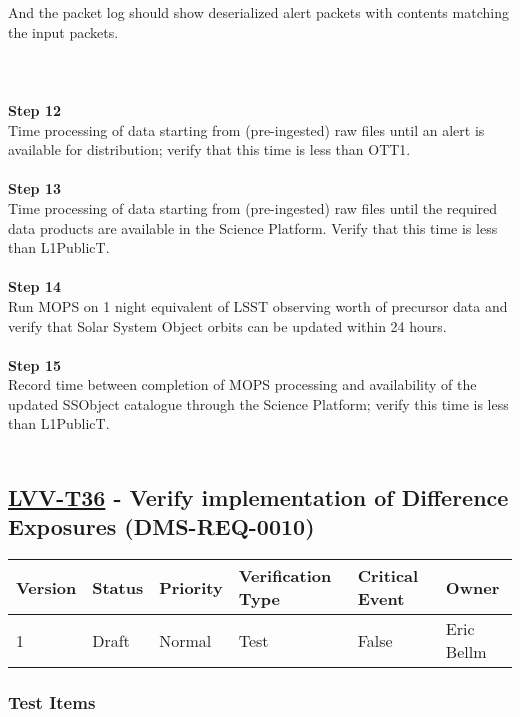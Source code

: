 And the packet log should show deserialized alert packets with contents
matching the input packets.\\
~\\
~\\
~\\
\textbf{Step 12}\\
Time processing of data starting from (pre-ingested) raw files until an
alert is available for distribution; verify that this time is less than
OTT1.\\
~\\
\textbf{Step 13}\\
Time processing of data starting from (pre-ingested) raw files until the
required data products are available in the Science Platform. Verify
that this time is less than L1PublicT.\\
~\\
\textbf{Step 14}\\
Run MOPS on 1 night equivalent of LSST observing worth of precursor data
and verify that Solar System Object orbits can be updated within 24
hours.\\
~\\
\textbf{Step 15}\\
Record time between completion of MOPS processing and availability of
the updated SSObject catalogue through the Science Platform; verify this
time is less than L1PublicT.\\
~\\

\hypertarget{lvv-t36---verify-implementation-of-difference-exposures-dms-req-0010}{%
\subsection{\texorpdfstring{\href{https://jira.lsstcorp.org/secure/Tests.jspa\#/testCase/LVV-T36}{LVV-T36}
- Verify implementation of Difference Exposures
(DMS-REQ-0010)}{LVV-T36 - Verify implementation of Difference Exposures (DMS-REQ-0010)}}\label{lvv-t36---verify-implementation-of-difference-exposures-dms-req-0010}}

\begin{longtable}[]{@{}llllll@{}}
\toprule
Version & Status & Priority & Verification Type & Critical Event &
Owner\tabularnewline
\midrule
\endhead
1 & Draft & Normal & Test & False & Eric Bellm\tabularnewline
\bottomrule
\end{longtable}

\hypertarget{test-items-12}{%
\subsubsection{Test Items}\label{test-items-12}}

